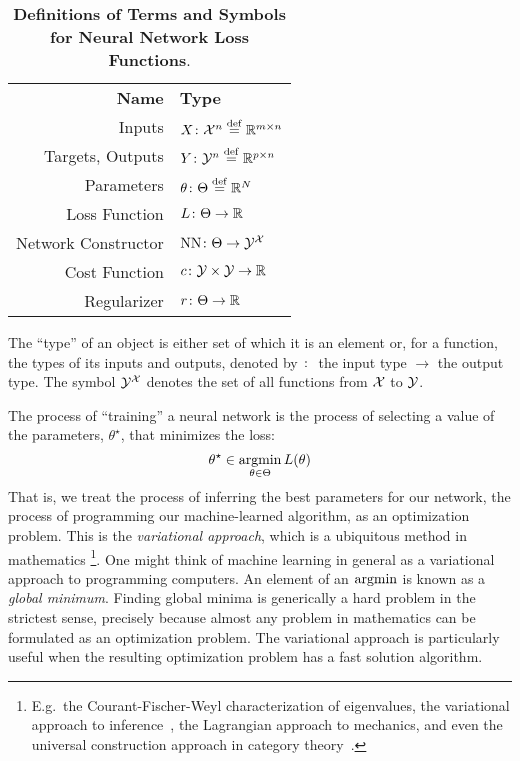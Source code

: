 \documentclass[../../thesis.tex]{subfiles}
\begin{document}
\begin{table}[h]
	\begin{center}
		\begin{tabular}{rl}
			\textbf{Name}       & \textbf{Type}                          \\
			Inputs              & $X \colon {\mathcal{X}}^n \stackrel{\small \mathrm{def}}{=} \mathbb{R}^{m\times n}$  \\
			Targets, Outputs    & $Y \colon {\mathcal{Y}}^n \stackrel{\small \mathrm{def}}{=} \mathbb{R}^{p\times n}$  \\
			Parameters          & $\theta \colon \Theta \stackrel{\small \mathrm{def}}{=} \mathbb{R}^N$        \\
			Loss Function       & $L \colon \Theta \to \mathbb{R}$                \\
			Network Constructor & $\mathrm{NN} \colon \Theta \to {\mathcal{Y}}^{\mathcal{X}}$ \\
			Cost Function       & $c \colon {\mathcal{Y}} \times {\mathcal{Y}} \to \mathbb{R}$        \\
			Regularizer         & $r \colon \Theta \to \mathbb{R}$
		\end{tabular}
	\end{center}
	\caption{\textbf{Definitions of Terms and Symbols for Neural Network Loss Functions}.}{%
		The \enquote{type} of an object is either set of which it is an element
		or, for a function, the types of its inputs and outputs,
		denoted by $\colon$ the input type $\to$ the output type.
		The symbol ${\mathcal{Y}}^{{\mathcal{X}}}$
		denotes the set of all functions from ${\mathcal{X}}$ to ${\mathcal{Y}}$.
	}
\end{table}

The process of \enquote{training} a neural network is the process
of selecting a value of the parameters, $\theta^\star$, that minimizes the loss:
\begin{equation}\equationlabel{minimize}
	\theta^\star \in \argmin_{\theta \in \Theta} L(\theta)
\end{equation}
That is, we treat the process of inferring the best parameters for our network,
the process of programming our machine-learned algorithm,
as an optimization problem.
This is the \emph{variational approach},
which is a ubiquitous method in mathematics%
\footnote{E.g.~the Courant-Fischer-Weyl characterization of eigenvalues,
the variational approach to inference~\cite{wainwright2007},
the Lagrangian approach to mechanics,
and even the universal construction approach in category theory~\cite{milewski2014}.
}.
One might think of machine learning in general as
a variational approach to programming computers.
An element of an $\mathop{\mathrm{argmin}}$ is known as a \emph{global minimum}.
Finding global minima is generically a hard problem in the strictest sense,
precisely because almost any problem in mathematics can be formulated as an
optimization problem.
The variational approach is particularly useful
when the resulting optimization problem
has a fast solution algorithm.
\end{document}
